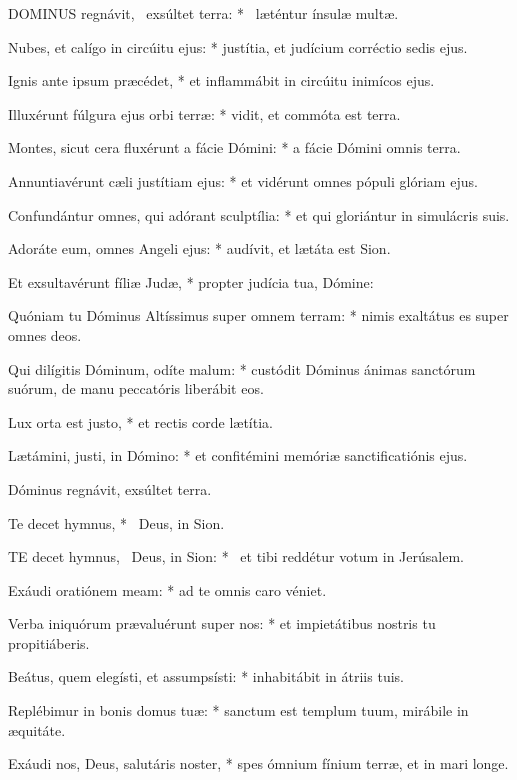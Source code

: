 
\lettrine[lines=2]{D}{OMINUS} regnávit, \textdagger\ exsúltet terra: * \textdaggerdbl\ læténtur ínsulæ multæ.

Nubes, et calígo in circúitu ejus: * justítia, et judícium corréctio sedis ejus.

Ignis ante ipsum præcédet, * et inflammábit in circúitu inimícos ejus.

Illuxérunt fúlgura ejus orbi terræ: * vidit, et commóta est terra.

Montes, sicut cera fluxérunt a fácie Dómini: * a fácie Dómini omnis terra.

Annuntiavérunt cæli justítiam ejus: * et vidérunt omnes pópuli glóriam ejus.

Confundántur omnes, qui adórant sculptília: * et qui gloriántur in simulácris suis.

Adoráte eum, omnes Angeli ejus: * audívit, et lætáta est Sion.

Et exsultavérunt fíliæ Judæ, * propter judícia tua, Dómine:

Quóniam tu Dóminus Altíssimus super omnem terram: * nimis exaltátus es super omnes deos.

Qui dilígitis Dóminum, odíte malum: * custódit Dóminus ánimas sanctórum suórum, de manu peccatóris liberábit eos.

Lux orta est justo, * et rectis corde lætítia.

Lætámini, justi, in Dómino: * et confitémini memóriæ sanctificatiónis ejus.

 Dóminus regnávit, exsúltet terra.

 Te decet hymnus, * \textdagger\ Deus, in Sion. \textdaggerdbl


\lettrine[lines=2]{T}{E} decet hymnus, \textdagger\ Deus, in Sion: * \textdaggerdbl\ et tibi reddétur votum in Jerúsalem.

Exáudi oratiónem meam: * ad te omnis caro véniet.

Verba iniquórum prævaluérunt super nos: * et impietátibus nostris tu propitiáberis.

Beátus, quem elegísti, et assumpsísti: * inhabitábit in átriis tuis.

Replébimur in bonis domus tuæ: * sanctum est templum tuum, mirábile in æquitáte.

Exáudi nos, Deus, salutáris noster, * spes ómnium fínium terræ, et in mari longe.

